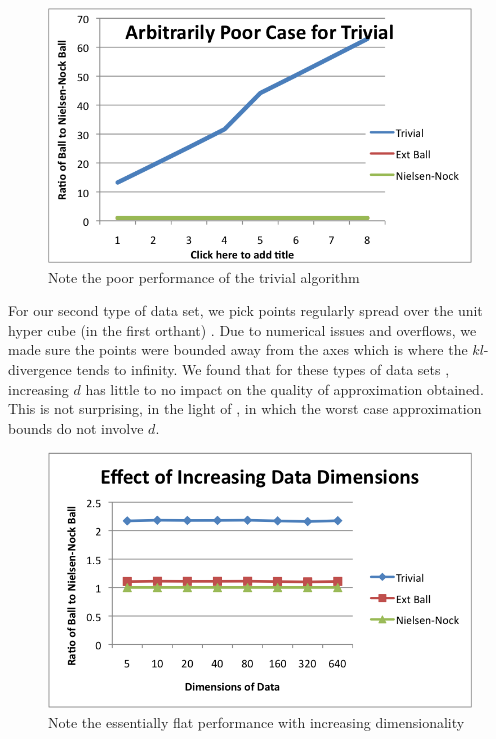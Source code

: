 \documentclass[11pt]{myclass}
\begin{document}
\begin{figure}[H]
  \begin{center}
    \includegraphics[scale = 0.8]{../figures/trivial_poor.png}
  \end{center}
  \caption{Note the poor performance of the trivial algorithm}
\end{figure}

For our second type of data set, we pick points regularly spread over the unit hyper cube (in the first orthant) . Due to numerical issues and overflows, we made sure the points were bounded away from the axes which is where the $kl$-divergence tends to infinity. We found that for these types of data sets , increasing $d$ has little to no impact on the quality of approximation obtained. This is not surprising, in the light of \cite{onepointfive}, in which the worst case approximation bounds do not involve $d$.

\begin{figure}[H]
  \begin{center}
    \includegraphics[scale = 0.8]{../figures/inc_dimensions.png}
  \end{center}
  \caption{Note the essentially flat performance with increasing dimensionality }
  \label{incdim}
\end{figure}
\end{document}
